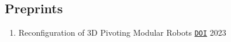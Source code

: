 \documentclass[letterpaper,11pt]{article}
\makeatletter
\newcommand{\resumeSubHeadingListStart}{\begin{itemize}[leftmargin=*]}
\newcommand{\resumeSubHeadingListEnd}{\end{itemize}}
\newcommand{\resumeOneLine}[2]{%
  \item[] #1 #2
}
\newcommand{\pdficon}{\faFilePdf}
\newcommand{\doilabel}{\texttt{DOI}}
\makeatother
\begin{document}
    \subsection*{Preprints}%
  
    \begin{enumerate}
    \setcounter{enumi}{\value{pubnum}}
      
        \resumeOneLine{Reconfiguration of 3D Pivoting Modular Robots%
\quad\href{tba/docstore/Reconfiguration-3D-Pivoting-MR-SOCGYRF.pdf}{\pdficon}%
%
\quad\href{https://doi.org/10.48550/arXiv.2304.09990}{\doilabel}%
        }{2023}
 
    \setcounter{pubnum}{\value{enumi}}
    \end{enumerate}

\end{document}
